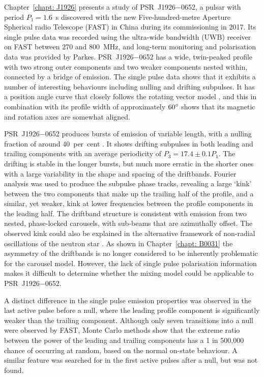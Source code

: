 Chapter~\ref{chapt: J1926} presents a study of PSR~J1926$-$0652, a pulsar with period $P_1 = 1.6$~s discovered with the new Five-hundred-metre Aperture Spherical radio Telescope (FAST) in China during its commissioning in 2017. Its single pulse data was recorded using the ultra-wide bandwidth (UWB) receiver on FAST between 270 and 800~MHz, and long-term monitoring and polarisation data was provided by Parkes. PSR~J1926$-$0652 has a wide, twin-peaked profile with two strong outer components and two weaker components nested within, connected by a bridge of emission. The single pulse data shows that it exhibits a number of interesting behaviours including nulling and drifting subpulses. It has a position angle curve that closely follows the rotating vector model \citep{RCxx1969, Kxxx1970}, and this in combination with its profile width of approximately $60^\circ$ shows that its magnetic and rotation axes are somewhat aligned.

PSR~J1926$-$0652 produces bursts of emission of variable length, with a nulling fraction of around 40~per~cent \citep{ZLH+2019}. It shows drifting subpulses in both leading and trailing components with an average periodicity of $P_3 = 17.4\pm0.1P_1$. The drifting is stable in the longer bursts, but much more erratic in the shorter ones with a large variability in the shape and spacing of the driftbands. Fourier analysis was used to produce the subpulse phase tracks, revealing a large `kink' between the two components that make up the trailing half of the profile, and a similar, yet weaker, kink at lower frequencies between the profile components in the leading half. The driftband structure is consistent with emission from two nested, phase-locked carousels, with sub-beams that are azimuthally offset. The observed kink could also be explained in the alternative framework of non-radial oscillations of the neutron star \citep[e.g.][]{CRxx2004}. As shown in Chapter~\ref{chapt: B0031} the asymmetry of the driftbands is no longer considered to be inherently problematic for the carousel model. However, the lack of single pulse polarisation information makes it difficult to determine whether the mixing model could be applicable to PSR~J1926$-$0652.

A distinct difference in the single pulse emission properties was observed in the last active pulse before a null, where the leading profile component is significantly weaker than the trailing component. Although only seven transitions into a null were observed by FAST, Monte Carlo methods show that the extreme ratio between the power of the leading and trailing components has a 1 in 500,000 chance of occurring at random, based on the normal on-state behaviour. A similar feature was searched for in the first active pulses after a null, but was not found.  

